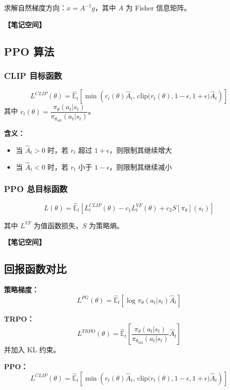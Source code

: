 \documentclass[12pt,a4paper]{article}
\newcommand{\notespace}[1][3cm]{%
  \vspace{#1}%
  \noindent\textbf{【笔记空间】}%
  \vspace{#1}%
}
\newcommand{\E}{\mathbb{E}}
\newcommand{\1}{\mathbf{1}}
\begin{document}
求解自然梯度方向：$x=A^{-1}g$，其中 $A$ 为 Fisher 信息矩阵。

\notespace[2cm]

\subsection{PPO 算法}

\subsubsection*{CLIP 目标函数}

\begin{keybox}
\begin{equation}
L^{CLIP}(\theta)=\hat{\E}_t\left[\min\left(r_t(\theta)\hat{A}_t,\,\text{clip}\bigl(r_t(\theta),1-\epsilon,1+\epsilon\bigr)\hat{A}_t\right)\right]
\end{equation}
其中 $r_t(\theta)=\dfrac{\pi_\theta(a_t|s_t)}{\pi_{\theta_{\text{old}}}(a_t|s_t)}$。
\end{keybox}

\textbf{含义：}
\begin{itemize}[leftmargin=2em]
  \item 当 $\hat{A}_t>0$ 时，若 $r_t$ 超过 $1+\epsilon$，则限制其继续增大
  \item 当 $\hat{A}_t<0$ 时，若 $r_t$ 小于 $1-\epsilon$，则限制其继续减小
\end{itemize}

\subsubsection*{PPO 总目标函数}

\begin{equation}
L(\theta)=\hat{\E}_t\left[L_t^{CLIP}(\theta)-c_1 L_t^{VF}(\theta)+c_2 S[\pi_\theta](s_t)\right]
\end{equation}

其中 $L^{VF}$ 为值函数损失，$S$ 为策略熵。

\notespace[2cm]

\subsection{回报函数对比}

\begin{summarybox}
\textbf{策略梯度：}
\begin{equation}
L^{PG}(\theta)=\hat{\E}_t\left[\log\pi_\theta(a_t|s_t)\hat{A}_t\right]
\end{equation}

\textbf{TRPO：}
\begin{equation}
L^{TRPO}(\theta)=\hat{\E}_t\left[\frac{\pi_\theta(a_t|s_t)}{\pi_{\theta_{\text{old}}}(a_t|s_t)}\hat{A}_t\right]
\end{equation}
并加入 KL 约束。

\textbf{PPO：}
\begin{equation}
L^{CLIP}(\theta)=\hat{\E}_t\left[\min\left(r_t(\theta)\hat{A}_t,\,\text{clip}\bigl(r_t(\theta),1-\epsilon,1+\epsilon\bigr)\hat{A}_t\right)\right]
\end{equation}
\end{summarybox}
\end{document}
